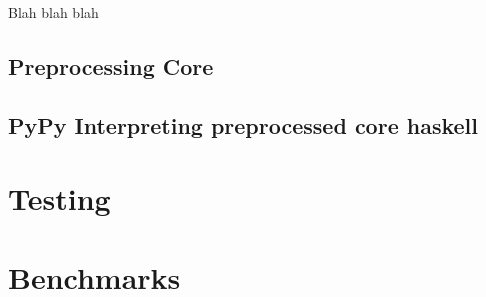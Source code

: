 \documentclass{article}
\begin{document}
Blah blah blah

\subsection{Preprocessing Core}


\subsection{PyPy Interpreting preprocessed core haskell}


\section{Testing}


\section{Benchmarks}





\end{document}
